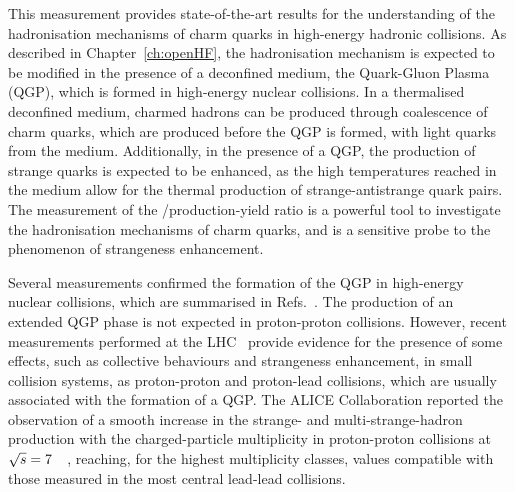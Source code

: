 This measurement provides state-of-the-art results for the understanding of the hadronisation mechanisms of charm quarks in high-energy hadronic collisions. As described in Chapter~\ref{ch:openHF}, the hadronisation mechanism is expected to be modified in the presence of a deconfined medium, the Quark-Gluon Plasma (QGP), which is formed in high-energy nuclear collisions. In a thermalised deconfined medium, charmed hadrons can be produced through coalescence of charm quarks, which are produced before the QGP is formed, with light quarks from the medium. Additionally, in the presence of a QGP, the production of strange quarks is expected to be enhanced, as the high temperatures reached in the medium allow for the thermal production of strange-antistrange quark pairs. The measurement of the \ds/\dpl production-yield ratio is a powerful tool to investigate the hadronisation mechanisms of charm quarks, and is a sensitive probe to the phenomenon of strangeness enhancement. 

Several measurements confirmed the formation of the QGP in high-energy nuclear collisions, which are summarised in Refs.~\cite{ALICE:2022wpn,STAR:2005gfr,PHENIX:2004vcz}. The production of an extended QGP phase is not expected in proton-proton collisions. However, recent measurements performed at the LHC~\cite{CMS:2016fnw,CMS:2010ifv,ALICE:2019zfl} provide evidence for the presence of some effects, such as collective behaviours and strangeness enhancement, in small collision systems, as proton-proton and proton-lead collisions, which are usually associated with the formation of a QGP. The ALICE Collaboration reported the observation of a smooth increase in the strange- and multi-strange-hadron production with the charged-particle multiplicity in proton-proton collisions at $\sqrt{s}=7$~\tev~\cite{ALICE:2016fzo}, reaching, for the highest multiplicity classes, values compatible with those measured in the most central lead-lead collisions. 

